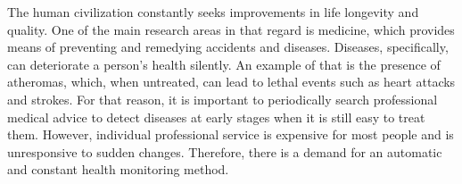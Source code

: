 
The human civilization constantly seeks improvements in life longevity and quality. One of the main research areas in that regard is medicine, which provides means of preventing and remedying accidents and diseases. Diseases, specifically, can deteriorate a person's health silently. An example of that is the presence of atheromas, which, when untreated, can lead to lethal events such as heart attacks and strokes. For that reason, it is important to periodically search professional medical advice to detect diseases at early stages when it is still easy to treat them. However, individual professional service is expensive for most people and is unresponsive to sudden changes. Therefore, there is a demand for an automatic and constant health monitoring method.  

